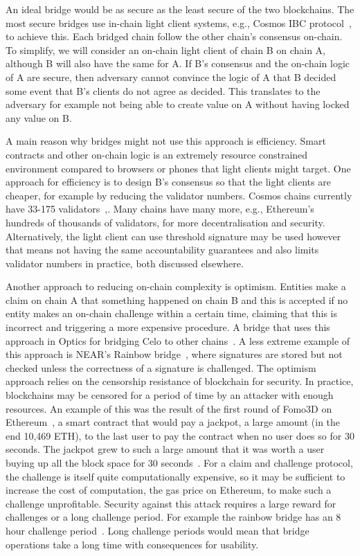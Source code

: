 \noindent An ideal bridge would be as secure as the least secure of the two blockchains. The most secure bridges use in-chain light client systems, e.g., Cosmos IBC protocol~\cite{IBC_paper}, to achieve this. Each bridged chain follow the other chain's consensus on-chain. To simplify, we will consider an on-chain light client of chain B on chain A, although B will also have the same for A. If B's consensus and the on-chain logic of A are secure, then adversary cannot convince the logic of A that B decided some event that B's clients do not agree as decided. This translates to the adversary for example not being able to create value on A without having locked any value on B.

\noindent A main reason why bridges might not use this approach is efficiency. Smart contracts and other on-chain logic is an extremely resource constrained environment compared to browsers or phones that light clients might target. One approach for efficiency is to design B's consensus so that the light clients are cheaper, for example by reducing the validator numbers. Cosmos chains currently have 33-175 validators~\cite{CosmosValNYX},\cite{CosmosValHUB}. Many chains have many more, e.g., Ethereum's hundreds of thousands of validators, for more decentralisation and security. Alternatively, the light client can use threshold signature may be used however that means not having the same accountability guarantees and also limits validator numbers in practice, both discussed elsewhere. 


\noindent Another approach to reducing on-chain complexity is optimism. Entities make a claim on chain A that something happened on chain B and this is accepted if no entity makes an on-chain challenge within a certain time, claiming that this is incorrect and triggering a more expensive procedure. A bridge that uses this approach in Optics for bridging Celo to other chains~\cite{CeloOptics}. A less extreme example of this approach is NEAR's Rainbow bridge~\cite{NEARrainbowB}, where signatures are stored but not checked unless the correctness of a signature is challenged. The optimism approach relies on the censorship resistance of blockchain for security. In practice, blockchains may be censored for a period of time by an attacker with enough resources. An example of this was the result of the first round of Fomo3D on Ethereum~\cite{Fomo3DPM}, a smart contract that would pay a jackpot, a large amount (in the end 10,469 ETH), to the last user to pay the contract when no user does so for 30 seconds. The jackpot grew to such a large amount that it was worth a user buying up all the block space for 30 seconds~\cite{Fomo3DPM}. For a claim and challenge protocol, the challenge is itself quite computationally expensive, so it may be sufficient to increase the cost of computation, the gas price on Ethereum, to make such a challenge unprofitable. Security against this attack requires a large reward for challenges or a long challenge period. For example the rainbow bridge has an 8 hour challenge period~\cite{RainbowBridgeFAQ}. Long challenge periods would mean that bridge operations take a long time with consequences for usability.

